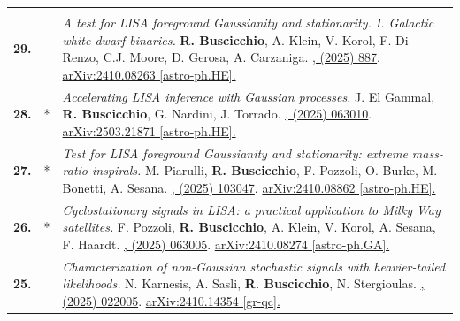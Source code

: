 {\begin{longtable}{rp{0.3cm}p{15.8cm}}
\vspace{0.09cm}\\
%
\textbf{29.} & & \textit{A test for LISA foreground Gaussianity and stationarity. I. Galactic white-dwarf binaries.}
\newline{}
\textbf{R. Buscicchio}, A. Klein, V. Korol, F. Di Renzo, C.J. Moore, D. Gerosa, A. Carzaniga.
\newline{}
\href{https://doi.org/10.1140/epjc/s10052-025-14616-w}{\epjc 85, (2025) 887}. \href{https://arxiv.org/abs/2410.08263}{arXiv:2410.08263 [astro-ph.HE].}
\vspace{0.09cm}\\
%
\textbf{28.} & * & \textit{Accelerating LISA inference with Gaussian processes.}
\newline{}
J. El Gammal, \textbf{R. Buscicchio}, G. Nardini, J. Torrado.
\newline{}
\href{https://doi.org/10.1103/c66v-rl3w}{\prd 112, (2025) 063010}. \href{https://arxiv.org/abs/2503.21871}{arXiv:2503.21871 [astro-ph.HE].}
\vspace{0.09cm}\\
%
\textbf{27.} & * & \textit{Test for LISA foreground Gaussianity and stationarity: extreme mass-ratio inspirals.}
\newline{}
M. Piarulli, \textbf{R. Buscicchio}, F. Pozzoli, O. Burke, M. Bonetti, A. Sesana.
\newline{}
\href{https://doi.org/10.1103/nfn4-pgr5}{\prd 111, (2025) 103047}. \href{https://arxiv.org/abs/2410.08862}{arXiv:2410.08862 [astro-ph.HE].}
\vspace{0.09cm}\\
%
\textbf{26.} & * & \textit{Cyclostationary signals in LISA: a practical application to Milky Way satellites.}
\newline{}
F. Pozzoli, \textbf{R. Buscicchio}, A. Klein, V. Korol, A. Sesana, F. Haardt.
\newline{}
\href{https://doi.org/10.1103/PhysRevD.111.063005}{\prd 111, (2025) 063005}. \href{https://arxiv.org/abs/2410.08274}{arXiv:2410.08274 [astro-ph.GA].}
\vspace{0.09cm}\\
%
\textbf{25.} & & \textit{Characterization of non-Gaussian stochastic signals with heavier-tailed likelihoods.}
\newline{}
N. Karnesis, A. Sasli, \textbf{R. Buscicchio}, N. Stergioulas.
\newline{}
\href{https://doi.org/10.1103/PhysRevD.111.022005}{\prd 111, (2025) 022005}. \href{https://arxiv.org/abs/2410.14354}{arXiv:2410.14354 [gr-qc].}

\end{longtable}}
